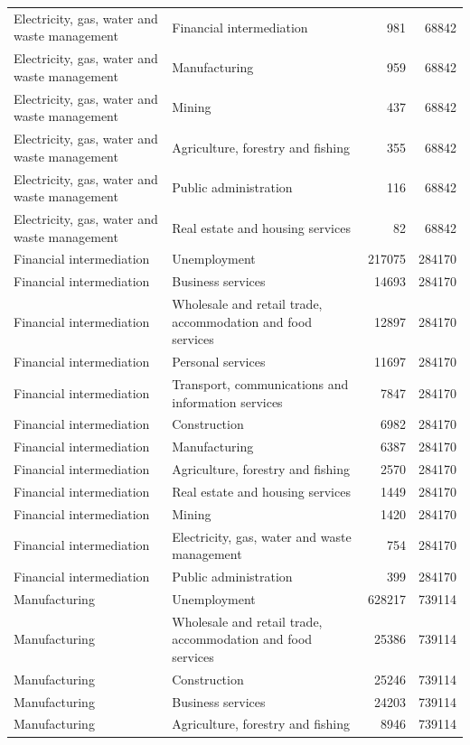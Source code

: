 \begin{longtable}{llrr}
Electricity, gas, water and waste management & Financial intermediation & 981 & 68842 \\
Electricity, gas, water and waste management & Manufacturing & 959 & 68842 \\
Electricity, gas, water and waste management & Mining & 437 & 68842 \\
Electricity, gas, water and waste management & Agriculture, forestry and fishing & 355 & 68842 \\
Electricity, gas, water and waste management & Public administration & 116 & 68842 \\
Electricity, gas, water and waste management & Real estate and housing services & 82 & 68842 \\
Financial intermediation & Unemployment & 217075 & 284170 \\
Financial intermediation & Business services & 14693 & 284170 \\
Financial intermediation & Wholesale and retail trade, accommodation and food services & 12897 & 284170 \\
Financial intermediation & Personal services & 11697 & 284170 \\
Financial intermediation & Transport, communications and information services & 7847 & 284170 \\
Financial intermediation & Construction & 6982 & 284170 \\
Financial intermediation & Manufacturing & 6387 & 284170 \\
Financial intermediation & Agriculture, forestry and fishing & 2570 & 284170 \\
Financial intermediation & Real estate and housing services & 1449 & 284170 \\
Financial intermediation & Mining & 1420 & 284170 \\
Financial intermediation & Electricity, gas, water and waste management & 754 & 284170 \\
Financial intermediation & Public administration & 399 & 284170 \\
Manufacturing & Unemployment & 628217 & 739114 \\
Manufacturing & Wholesale and retail trade, accommodation and food services & 25386 & 739114 \\
Manufacturing & Construction & 25246 & 739114 \\
Manufacturing & Business services & 24203 & 739114 \\
Manufacturing & Agriculture, forestry and fishing & 8946 & 739114 \\

\end{longtable}
